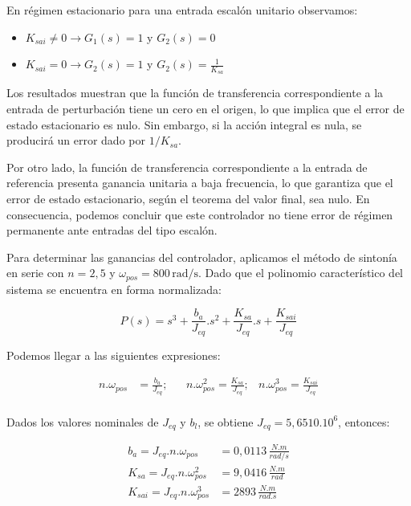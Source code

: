 \documentclass{article}
\begin{document}
En régimen estacionario para una entrada escalón unitario observamos:

\begin{itemize}
    \item $K_{sai} \neq 0 \to G_1(s) = 1 $ y $G_2(s) = 0$
    \item $K_{sai} = 0 \to G_2(s) = 1 $ y $G_2(s) = \frac{1}{K_{sa}} $
\end{itemize}

Los resultados muestran que la función de transferencia correspondiente a la entrada de perturbación 
tiene un cero en el origen, lo que implica que el error de estado estacionario es nulo. Sin embargo, 
si la acción integral es nula, se producirá un error dado por $1/K_{sa}$.

Por otro lado, la función de transferencia correspondiente a la entrada de referencia presenta ganancia 
unitaria a baja frecuencia, lo que garantiza que el error de estado estacionario, según el teorema del 
valor final, sea nulo. En consecuencia, podemos concluir que este controlador no tiene error de régimen 
permanente ante entradas del tipo escalón.

Para determinar las ganancias del controlador, aplicamos el método de sintonía en serie con $n = 2,5$ y 
$\omega_{pos} = 800 \, \text{rad/s}$. Dado que el polinomio característico del sistema se encuentra en 
forma normalizada:

\begin{equation}
    P(s) = s^3 + \frac{b_a}{J_{eq}}.s^2 + \frac{K_{sa}}{J_{eq}}.s + \frac{K_{sai}}{J_{eq}}
\end{equation}

Podemos llegar a las siguientes expresiones:

\begin{align*}
    n.\omega_{pos} &= \frac{b_a}{J_{eq}}; & &n.\omega_{pos}^2 = \frac{K_{sa}}{J_{eq}}; & n.\omega_{pos}^3 = \frac{K_{sai}}{J_{eq}} \\
\end{align*}

Dados los valores nominales de $J_{eq}$ y $b_l$, se obtiene $J_{eq} = 5,6510.10^6$, entonces:

\begin{align*}
    b_a = J_{eq}.n.\omega_{pos} &= 0,0113\, \frac{N.m}{rad/s} \\ 
    K_{sa} = J_{eq}.n.\omega_{pos}^2 &= 9,0416\, \frac{N.m}{rad} \\
    K_{sai} = J_{eq}.n.\omega_{pos}^3 &= 2893\, \frac{N.m}{rad.s}
\end{align*}
\end{document}
